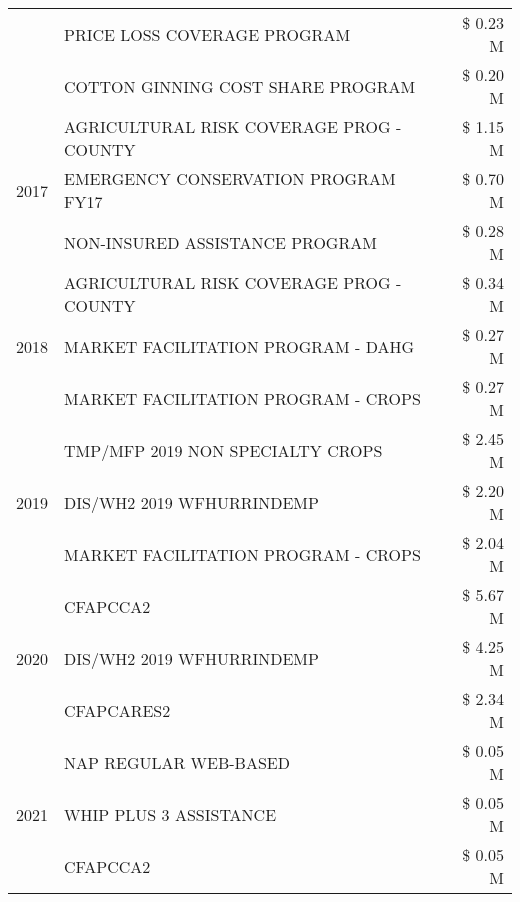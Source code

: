 \begin{tabular}{llr}
 & PRICE LOSS COVERAGE PROGRAM & \$ 0.23 M \\
 & COTTON GINNING COST SHARE PROGRAM & \$ 0.20 M \\
\cline{1-3}
\multirow[t]{3}{*}{2017} & AGRICULTURAL RISK COVERAGE PROG - COUNTY & \$ 1.15 M \\
 & EMERGENCY CONSERVATION PROGRAM FY17 & \$ 0.70 M \\
 & NON-INSURED ASSISTANCE PROGRAM & \$ 0.28 M \\
\cline{1-3}
\multirow[t]{3}{*}{2018} & AGRICULTURAL RISK COVERAGE PROG - COUNTY & \$ 0.34 M \\
 & MARKET FACILITATION PROGRAM - DAHG & \$ 0.27 M \\
 & MARKET FACILITATION PROGRAM - CROPS & \$ 0.27 M \\
\cline{1-3}
\multirow[t]{3}{*}{2019} & TMP/MFP 2019 NON SPECIALTY CROPS & \$ 2.45 M \\
 & DIS/WH2 2019 WFHURRINDEMP & \$ 2.20 M \\
 & MARKET FACILITATION PROGRAM - CROPS & \$ 2.04 M \\
\cline{1-3}
\multirow[t]{3}{*}{2020} & CFAPCCA2 & \$ 5.67 M \\
 & DIS/WH2 2019 WFHURRINDEMP & \$ 4.25 M \\
 & CFAPCARES2 & \$ 2.34 M \\
\cline{1-3}
\multirow[t]{3}{*}{2021} & NAP REGULAR WEB-BASED & \$ 0.05 M \\
 & WHIP PLUS 3 ASSISTANCE & \$ 0.05 M \\
 & CFAPCCA2 & \$ 0.05 M \\
\cline{1-3}
\bottomrule
\end{tabular}
